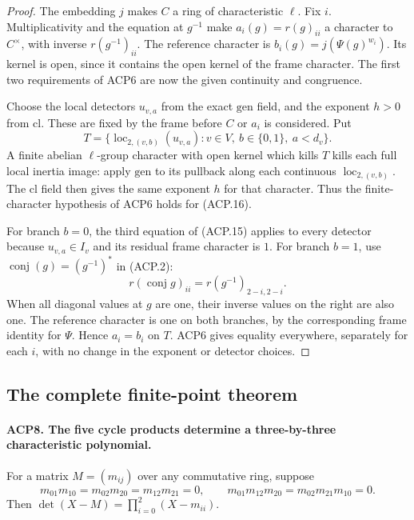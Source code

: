 \begin{proof}
The embedding \(j\) makes \(C\) a ring of characteristic
\(\ell\).  Fix \(i\).  Multiplicativity and the equation at
\(g^{-1}\) make \(a_i(g)=r(g)_{ii}\) a character to
\(C^\times\), with inverse \(r(g^{-1})_{ii}\).
The reference character is \(b_i(g)=j(\Psi(g)^{w_i})\).
Its kernel is open, since it contains the open kernel of the
frame character.  The first two requirements of ACP6 are now
the given continuity and congruence.

Choose the local detectors \(u_{v,a}\) from the exact
\(\mathrm{gen}\) field, and the exponent \(h>0\) from
\(\mathrm{cl}\).  These are fixed by the frame before \(C\)
or \(a_i\) is considered.  Put
\[
 T=\{\operatorname{loc}_{2,(v,b)}(u_{v,a}):
                        v\in V,\ b\in\{0,1\},\ a<d_v\}.
                                                        \tag{ACP.16}
\]
A finite abelian \(\ell\)-group character with open kernel
which kills \(T\) kills each full local inertia image:
apply \(\mathrm{gen}\) to its pullback along each continuous
\(\operatorname{loc}_{2,(v,b)}\).  The \(\mathrm{cl}\) field
then gives the same exponent \(h\) for that character.  Thus
the finite-character hypothesis of ACP6 holds for (ACP.16).

For branch \(b=0\), the third equation of (ACP.15) applies
to every detector because \(u_{v,a}\in I_v\) and its residual
frame character is \(1\).  For branch \(b=1\), use
\(\operatorname{conj}(g)=(g^{-1})^*\) in (ACP.2):
\[
 r(\operatorname{conj}g)_{ii}=r(g^{-1})_{2-i,2-i}.
\]
When all diagonal values at \(g\) are one, their inverse
values on the right are also one.  The reference character is
one on both branches, by the corresponding frame identity
for \(\Psi\).  Hence \(a_i=b_i\) on \(T\).
ACP6 gives equality everywhere, separately for each \(i\),
with no change in the exponent or detector choices.
\end{proof}

\subsection{The complete finite-point theorem}

\paragraph{ACP8. The five cycle products determine a three-by-three characteristic polynomial.}
\label{claim:ACP8}
For a matrix \(M=(m_{ij})\) over any commutative ring, suppose
\[
 m_{01}m_{10}=m_{02}m_{20}=m_{12}m_{21}=0,
 \qquad m_{01}m_{12}m_{20}=m_{02}m_{21}m_{10}=0.
                                                        \tag{ACP.17}
\]
Then \(\det(X-M)=\prod_{i=0}^2(X-m_{ii})\).

